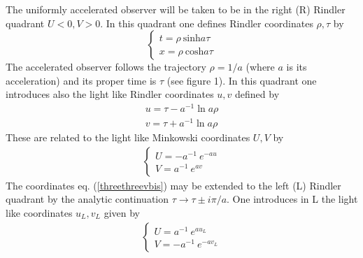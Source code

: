 The uniformly accelerated observer
will be
taken to be in the right
(R) Rindler
quadrant $U<0,V>0$. In this quadrant one defines Rindler coordinates $\rho ,
\tau$ by
\begin{equation} \left \{ \begin{array}{ll} t=\rho\ \mbox{sinh} a\tau
\\ x=\rho\ \mbox{cosh} a\tau \end{array} \right. \label{threethreevbis}
\end{equation}
The accelerated observer follows the trajectory
$\rho = 1/a$ (where $a$ is its acceleration)
and its proper time is $\tau$
(see figure 1).
In this quadrant one introduces also the light like
Rindler coordinates $u,v$ defined by \begin{eqnarray}
u = \tau - a^{-1} \ln a\rho
\nonumber\\
 v= \tau + a^{-1} \ln a\rho
\end{eqnarray}
These are related to the light like Minkowski coordinates $U, V$ by
\begin{eqnarray}
\left \{ \begin{array}{ll}
U=-a^{-1}\ e^{-au} \\ V=a^{-1}\ e^{av} \end{array} \right.
\label{threethreevi} \end{eqnarray}
 The
coordinates eq. (\ref{threethreevbis})  may be extended to the left (L) Rindler
quadrant by the analytic continuation $\tau \rightarrow \tau \pm i \pi/a$. One
introduces in L the light like coordinates $u_L, v_L$ given by
\begin{eqnarray}
\left \{ \begin{array}{ll}
U=a^{-1}\ e^{au_L} \\ V=- a^{-1}\ e^{- a v_L}\end{array} \right.
\label{threethreeviL}
\end{eqnarray}


